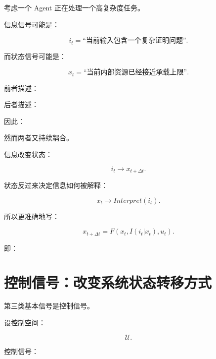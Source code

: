 考虑一个 Agent 正在处理一个高复杂度任务。

信息信号可能是：

\[
i_t=
\text{“当前输入包含一个复杂证明问题”}.
\]

而状态信号可能是：

\[
x_t=
\text{“当前内部资源已经接近承载上限”}.
\]

前者描述：

\begin{statementbox}
\centering
{}
\end{statementbox}

后者描述：

\begin{statementbox}
\centering
{}
\end{statementbox}

因此：

\begin{statementbox}
\centering
{}
\end{statementbox}

然而两者又持续耦合。

信息改变状态：

\[
i_t
\rightarrow
x_{t+\Delta t}.
\]

状态反过来决定信息如何被解释：

\[
x_t
\rightarrow
Interpret(i_t).
\]

所以更准确地写：

\[
\boxed{
x_{t+\Delta t}
=
F(
x_t,
I(i_t|x_t),
u_t
).
}
\]

即：

\begin{statementbox}
\centering
{}
\end{statementbox}

\section{控制信号：改变系统状态转移方式}

第三类基本信号是控制信号。

设控制空间：

\[
\mathcal U.
\]

控制信号：

